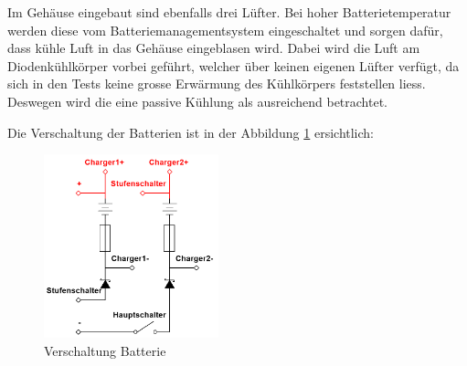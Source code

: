 Im Gehäuse eingebaut sind ebenfalls drei Lüfter. Bei hoher Batterietemperatur werden diese vom Batteriemanagementsystem eingeschaltet und sorgen dafür, dass kühle Luft in das Gehäuse eingeblasen wird. Dabei wird die Luft am Diodenkühlkörper vorbei geführt, welcher über keinen eigenen Lüfter verfügt, da sich in den Tests keine grosse Erwärmung des Kühlkörpers feststellen liess. Deswegen wird die eine passive Kühlung als ausreichend betrachtet.

Die Verschaltung der Batterien ist in der Abbildung \ref{fig:versch_bat} ersichtlich:

\begin{figure}[h!]
	\centering
		\includegraphics[width=0.45\textwidth]{images/BAT.PNG}
	\caption{Verschaltung Batterie}
	\label{fig:versch_bat}
\end{figure}